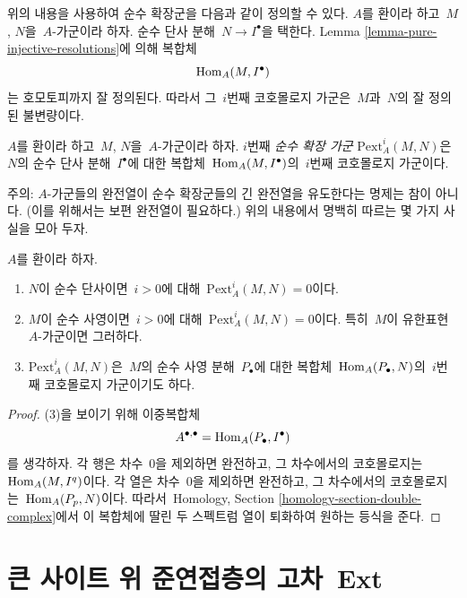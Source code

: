 \noindent
위의 내용을 사용하여 순수 확장군을 다음과 같이 정의할 수 있다.
$A$를 환이라 하고\  $M$, $N$을\  $A$-가군이라 하자. 순수 단사 분해\ 
$N \to I^\bullet$을 택한다. Lemma
\ref{lemma-pure-injective-resolutions}에 의해 복합체
$$
\mathop{\mathrm{Hom}}\nolimits_A(M, I^\bullet)
$$
는 호모토피까지 잘 정의된다. 따라서 그\  $i$번째 코호몰로지 가군은\ 
$M$과\  $N$의 잘 정의된 불변량이다.

\begin{definition}
\label{definition-pure-ext}
$A$를 환이라 하고\  $M$, $N$을\  $A$-가군이라 하자. $i$번째
{\it 순수 확장 가군} $\text{Pext}^i_A(M, N)$은\  $N$의 순수 단사
분해\  $I^\bullet$에 대한 복합체\  $\mathop{\mathrm{Hom}}\nolimits_A(M, I^\bullet)$의\ 
$i$번째 코호몰로지 가군이다.
\end{definition}

\noindent
주의: $A$-가군들의 완전열이 순수 확장군들의 긴 완전열을 유도한다는
명제는 참이 아니다. (이를 위해서는 보편 완전열이 필요하다.)
위의 내용에서 명백히 따르는 몇 가지 사실을 모아 두자.

\begin{lemma}
\label{lemma-facts-pext}
$A$를 환이라 하자.
\begin{enumerate}
\item $N$이 순수 단사이면\  $i > 0$에 대해\ 
$\text{Pext}^i_A(M, N) = 0$이다.
\item $M$이 순수 사영이면\  $i > 0$에 대해\ 
$\text{Pext}^i_A(M, N) = 0$이다. 특히\  $M$이 유한표현\ 
$A$-가군이면 그러하다.
\item $\text{Pext}^i_A(M, N)$은\  $M$의 순수 사영 분해\ 
$P_\bullet$에 대한 복합체\  $\mathop{\mathrm{Hom}}\nolimits_A(P_\bullet, N)$의\  $i$번째
코호몰로지 가군이기도 하다.
\end{enumerate}
\end{lemma}

\begin{proof}
(3)을 보이기 위해 이중복합체
$$
A^{\bullet, \bullet} = \mathop{\mathrm{Hom}}\nolimits_A(P_\bullet, I^\bullet)
$$
를 생각하자. 각 행은 차수\  $0$을 제외하면 완전하고, 그 차수에서의
코호몰로지는\  $\mathop{\mathrm{Hom}}\nolimits_A(M, I^q)$이다. 각 열은 차수\  $0$을 제외하면
완전하고, 그 차수에서의 코호몰로지는\  $\mathop{\mathrm{Hom}}\nolimits_A(P_p, N)$이다.
따라서\  Homology, Section \ref{homology-section-double-complex}에서 이
복합체에 딸린 두 스펙트럼 열이 퇴화하여 원하는 등식을 준다.
\end{proof}





\section{큰 사이트 위 준연접층의 고차\  Ext}
\label{section-big}

